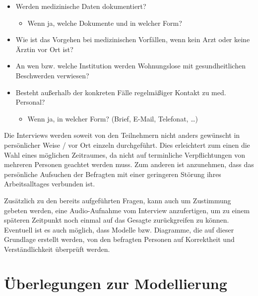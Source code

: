 \begin{itemize}
	\item Werden medizinische Daten dokumentiert?
	\begin{itemize}
		\item Wenn ja, welche Dokumente und in welcher Form?
	\end{itemize}
	\item Wie ist das Vorgehen bei medizinischen Vorfällen, wenn kein Arzt oder keine Ärztin vor Ort ist?
	\item An wen bzw. welche Institution werden Wohnungslose mit gesundheitlichen Beschwerden verwiesen?
	\item Besteht außerhalb der konkreten Fälle regelmäßiger Kontakt zu med. Personal?
	\begin{itemize}
		\item Wenn ja, in welcher Form? (Brief, E-Mail, Telefonat, …)
	\end{itemize}
\end{itemize}

Die Interviews werden soweit von den Teilnehmern nicht anders gewünscht in persönlicher Weise / vor Ort einzeln durchgeführt. Dies erleichtert zum einen die Wahl eines möglichen Zeitraumes, da nicht auf terminliche Verpflichtungen von mehreren Personen geachtet werden muss. Zum anderen ist anzunehmen, dass das persönliche Aufsuchen der Befragten mit einer geringeren Störung ihres Arbeitsalltages verbunden ist.

Zusätzlich zu den bereits aufgeführten Fragen, kann auch um Zustimmung gebeten werden, eine Audio-Aufnahme vom Interview anzufertigen, um zu einem späteren Zeitpunkt noch einmal auf das Gesagte zurückgreifen zu können. Eventuell ist es auch möglich, dass Modelle bzw. Diagramme, die auf dieser Grundlage erstellt werden, von den befragten Personen auf Korrektheit und Verständlichkeit überprüft werden.


\section{Überlegungen zur Modellierung}

